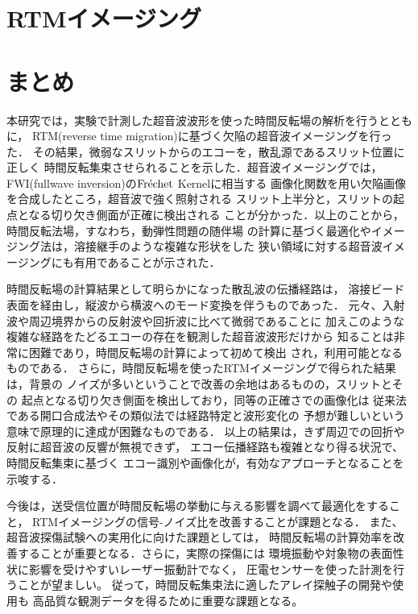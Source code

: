 \documentclass{jjsce}
\begin{document}
\section{RTMイメージング}
	
\section{まとめ}
本研究では，実験で計測した超音波波形を使った時間反転場の解析を行うとともに，
RTM(reverse time migration)に基づく欠陥の超音波イメージングを行った．
その結果，微弱なスリットからのエコーを，散乱源であるスリット位置に正しく
時間反転集束させられることを示した．超音波イメージングでは，
FWI(fullwave inversion)の${\rm Fr\acute{e}chet}$ Kernelに相当する
画像化関数を用い欠陥画像を合成したところ，超音波で強く照射される
スリット上半分と，スリットの起点となる切り欠き側面が正確に検出される
ことが分かった．以上のことから，時間反転法場，すなわち，動弾性問題の随伴場
の計算に基づく最適化やイメージング法は，溶接継手のような複雑な形状をした
狭い領域に対する超音波イメージングにも有用であることが示された．

時間反転場の計算結果として明らかになった散乱波の伝播経路は，
溶接ビード表面を経由し，縦波から横波へのモード変換を伴うものであった．
元々、入射波や周辺境界からの反射波や回折波に比べて微弱であることに
加えこのような複雑な経路をたどるエコーの存在を観測した超音波波形だけから
知ることは非常に困難であり，時間反転場の計算によって初めて検出
され，利用可能となるものである．
さらに，時間反転場を使ったRTMイメージングで得られた結果は，背景の
ノイズが多いということで改善の余地はあるものの，スリットとその
起点となる切り欠き側面を検出しており，同等の正確さでの画像化は
従来法である開口合成法やその類似法では経路特定と波形変化の
予想が難しいという意味で原理的に達成が困難なものである．
以上の結果は，きず周辺での回折や反射に超音波の反響が無視できず，
エコー伝播経路も複雑となり得る状況で、時間反転集束に基づく
エコー識別や画像化が，有効なアプローチとなることを示唆する．

今後は，送受信位置が時間反転場の挙動に与える影響を調べて最適化をすること，
RTMイメージングの信号-ノイズ比を改善することが課題となる．
また、超音波探傷試験への実用化に向けた課題としては，
時間反転場の計算効率を改善することが重要となる．さらに，実際の探傷には
環境振動や対象物の表面性状に影響を受けやすいレーザー振動計でなく，
圧電センサーを使った計測を行うことが望ましい。
従って，時間反転集束法に適したアレイ探触子の開発や使用も
高品質な観測データを得るために重要な課題となる。
\end{document}
